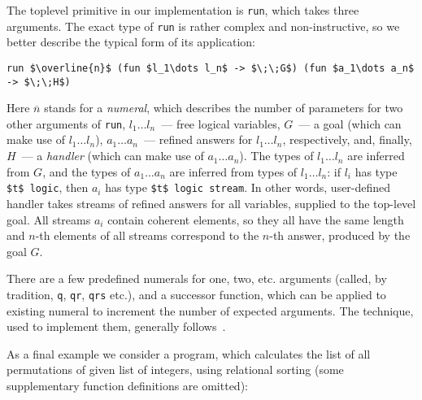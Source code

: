 \documentclass[10pt, oneside, nocopyrightspace]{sigplanconf}
\begin{document}
\begin{comment}
We did not make \lstinline{refine} accessible for an end-user; instead we provided
a set of top-level combinators, which should be used to surround relational code
and perform refinement in a transparent manner. Note, that from pragmatic
standpoint only variables, supplied as arguments for the top-level goal, have
to be refined (the original miniKanren implementation follows the same convention).
\end{comment}

The toplevel primitive in our implementation is \lstinline{run}, which takes three
arguments. The exact type of \lstinline{run} is rather complex and non-instructive, 
so we better describe the typical form of its application:

\begin{lstlisting}[mathescape=true]
   run $\overline{n}$ (fun $l_1\dots l_n$ -> $\;\;G$) (fun $a_1\dots a_n$ -> $\;\;H$)
\end{lstlisting}

Here $\overline{n}$ stands for a \emph{numeral}, which describes the number of
parameters for two other arguments of \lstinline{run}, \mbox{$l_1\dots l_n$}~---
free logical variables, $G$~--- a goal (which can make use of \mbox{$l_1\dots l_n$}), 
\mbox{$a_1\dots a_n$}~--- refined answers for \mbox{$l_1\dots l_n$}, respectively, and, 
finally, $H$~--- a \emph{handler} (which can make use of \mbox{$a_1\dots a_n$}). The types of 
\mbox{$l_1\dots l_n$} are inferred from $G$, and the types of \mbox{$a_1\dots a_n$} are
inferred from types of \mbox{$l_1\dots l_n$}: if $l_i$ has type \lstinline[mathescape=true]{$t$ logic}, then
$a_i$ has type \lstinline[mathescape=true]{$t$ logic stream}. In other words, user-defined handler
takes streams of refined answers for all variables, supplied to the top-level goal. All streams $a_i$ contain
coherent elements, so they all have the same length and $n$-th elements of all streams correspond 
to the $n$-th answer, produced by the goal $G$.

There are a few predefined numerals for one, two, etc. arguments (called, by tradition, 
\lstinline{q}, \lstinline{qr}, \lstinline{qrs} etc.), and a successor function, which 
can be applied to existing numeral to increment the number of expected arguments. The
technique, used to implement them, generally follows~\cite{Unparsing, DoWeNeed}.

As a final example we consider a program, which calculates the list of all permutations 
of given list of integers, using relational sorting (some supplementary function 
definitions are omitted):
\end{document}
